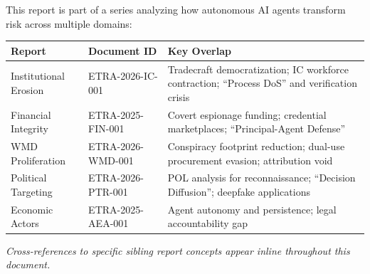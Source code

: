 \documentclass[11pt,letterpaper]{article}
\newcommand{\etraneed}[1]{\par\ifdim\pagegoal<\maxdimen\ifdim\pagetotal<\pagegoal\ifdim\dimexpr\pagegoal-\pagetotal\relax<\dimexpr#1\relax\newpage\fi\fi\fi}
\begin{document}
\etraneed{20\baselineskip}
\begin{infobox}
This report is part of a series analyzing how autonomous AI agents transform risk across multiple domains:

\vspace{0.5em}
\begin{center}
\small
\begin{tabular}{L{2.9cm}L{3.7cm}L{8.2cm}}
\toprule
\textbf{Report} & \textbf{Document ID} & \textbf{Key Overlap} \\
\midrule
Institutional Erosion & ETRA-2026-IC-001 & Tradecraft democratization; IC workforce contraction; ``Process DoS'' and verification crisis \\
Financial Integrity & ETRA-2025-FIN-001 & Covert espionage funding; credential marketplaces; ``Principal-Agent Defense'' \\
WMD Proliferation & ETRA-2026-WMD-001 & Conspiracy footprint reduction; dual-use procurement evasion; attribution void \\
Political Targeting & ETRA-2026-PTR-001 & POL analysis for reconnaissance; ``Decision Diffusion''; deepfake applications \\
Economic Actors & ETRA-2025-AEA-001 & Agent autonomy and persistence; legal accountability gap \\
\bottomrule
\end{tabular}
\end{center}

\textit{Cross-references to specific sibling report concepts appear inline throughout this document.}
\end{infobox}
\end{document}
